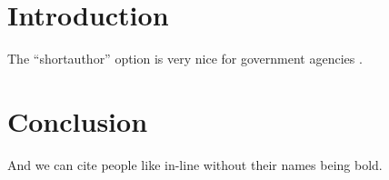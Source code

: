\documentclass{article}
\begin{document}
\section{Introduction}
\begin{refsection}
The ``shortauthor'' option is very nice for government agencies \parencite{EPA99}.
\printbibliography
\end{refsection}

\section{Conclusion}
\begin{refsection}
And we can cite people like \textcite{Tiebout56} in-line without their names
  being bold.
\nocite{*}  %
\printbibliography
\end{refsection}
\end{document}
